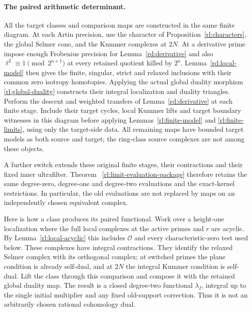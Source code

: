 \paragraph{The paired arithmetic determinant.}
All the target classes and comparison maps are constructed in the same
finite diagram.
At each Artin precision, use the character of
Proposition~\ref{rl:characters}, the global Selmer cone, and the
Kummer complexes at \(2N\).  At a derivative prime impose enough
Frobenius precision for Lemma~\ref{rd:derivative} and also
\(\ell^2\equiv1\pmod{2^{a+1}}\) at every retained quotient killed
by \(2^a\).  Lemma~\ref{rd:local-model} then gives the finite,
singular, strict and relaxed inclusions with their common zero
isotropy homotopies.  Applying the actual global duality morphism
\eqref{rl:global-duality} constructs their integral localization
and duality triangles.  Perform the descent and weighted transfers of
Lemma~\ref{rd:derivative} at each finite stage.  Include their target
cycles, local Kummer lifts and target boundary witnesses in this
diagram before applying Lemmas~\ref{rl:finite-model} and
\ref{rl:finite-limits}, using only the target-side data.
All remaining maps have bounded target models as both source and
target; the ring-class source complexes are not among these objects.

A further switch extends these original finite stages, their
contractions and their fixed inner ultrafilter.  Theorem~
\ref{rl:limit-evaluation-package} therefore retains the same
degree-zero, degree-one and degree-two evaluations and the
exact-kernel restrictions.  In particular, the old evaluations
are not replaced by maps on an independently chosen equivalent
complex.

Here is how a class produces its paired functional.  Work over a
height-one localization where the full local complexes at the active
primes and \(r\) are acyclic.  By Lemma~\ref{rl:local-acyclic}
this includes \(\mathcal O\) and every characteristic-zero test
used below.  These complexes have integral contractions.  They
identify the relaxed Selmer complex with its orthogonal complex;
at switched primes the plane condition is already self-dual, and
at \(2N\) the integral Kummer condition is self-dual.  Lift the
class through this comparison and compose it with the retained
global duality map.  The result is a closed degree-two functional
\(\lambda_I\), integral up to the single initial multiplier and
any fixed old-support correction.  Thus it is not an arbitrarily
chosen rational cohomology dual.


